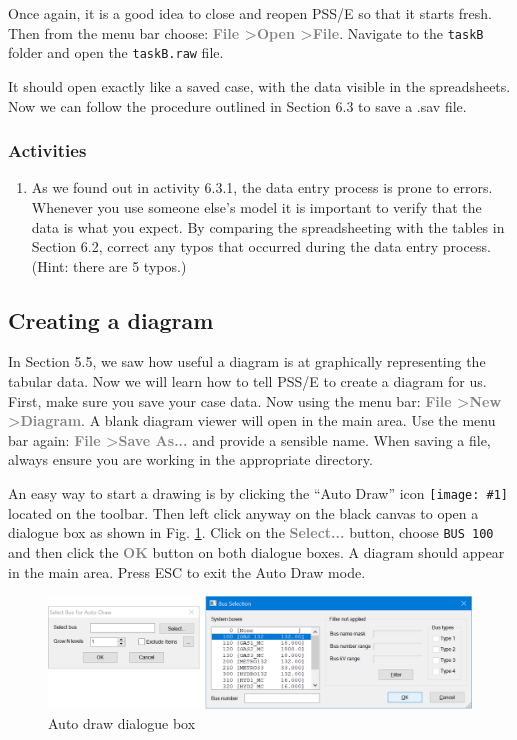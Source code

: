 \documentclass[paper=a4, fontsize=11pt]{article}
\newcommand{\mychar}[1]{%
  \begingroup\normalfont
  \texttt{[image: \#1]}%
  \endgroup
}
\begin{document}
Once again, it is a good idea to close and reopen PSS/E so that it starts fresh. Then from the menu bar choose: \textbf{\textcolor{gray}{File \textgreater \phantom{ }Open \textgreater \phantom{ }File}}. Navigate to the \texttt{taskB} folder and open the \texttt{taskB.raw} file.

It should open exactly like a saved case, with the data visible in the spreadsheets. Now we can follow the procedure outlined in Section 6.3 to save a .sav file.

\subsubsection*{Activities}
\begin{enumerate}
\item[\textbf{6.4.1}] As we found out in activity 6.3.1, the data entry process is prone to errors. Whenever you use someone else's model it is important to verify that the data is what you expect. By comparing the spreadsheeting with the tables in Section 6.2, correct any typos that occurred during the data entry process. (Hint: there are 5 typos.)
\end{enumerate}

\subsection{Creating a diagram}
In Section 5.5, we saw how useful a diagram is at graphically representing the tabular data. Now we will learn how to tell PSS/E to create a diagram for us. First, make sure you save your case data. Now using the menu bar: \textbf{\textcolor{gray}{File \textgreater \phantom{ }New \textgreater \phantom{ }Diagram}}. A blank diagram viewer will open in the main area. Use the menu bar again: \textbf{\textcolor{gray}{File \textgreater \phantom{ }Save As...}} and provide a sensible name. When saving a file, always ensure you are working in the appropriate directory.

An easy way to start a drawing is by clicking the ``Auto Draw'' icon \mychar{autodraw.png} located on the toolbar. Then left click anyway on the black canvas to open a dialogue box as shown in Fig. \ref{fig:10}. Click on the \textbf{\textcolor{gray}{Select...}} button, choose \texttt{BUS 100} and then click the \textbf{\textcolor{gray}{OK}} button on both dialogue boxes. A diagram should appear in the main area. Press ESC to exit the Auto Draw mode.

\begin{figure}[h]
\centering
\includegraphics[scale=0.32]{fig10_autodraw.pdf}
\caption{Auto draw dialogue box}
\label{fig:10}
\end{figure}
\end{document}
